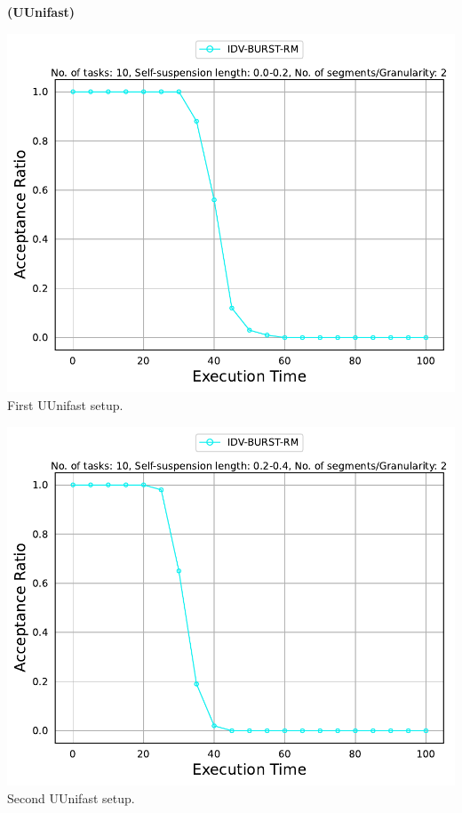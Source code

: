 \documentclass[]{article}
\begin{document}
	\begin{minipage}[t]{0.48\linewidth}
		\centering
		\textbf{(UUnifast)}
		\vspace{0.3cm}
		
		\includegraphics[width=\linewidth]{IDV-BURST-RM[2][0.0-0.2][10].pdf}
		First UUnifast setup.
		\vspace{0.3cm}
		
		\includegraphics[width=\linewidth]{IDV-BURST-RM[2][0.2-0.4][10].pdf}
		Second UUnifast setup.
		\vspace{0.3cm}
		

\end{minipage}
\end{document}

